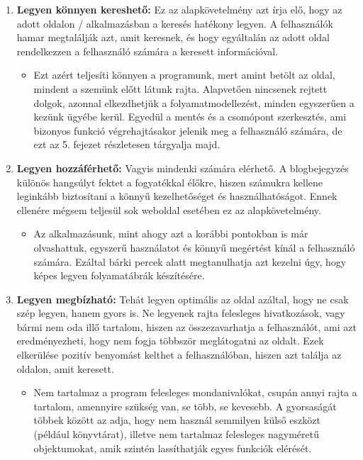 \begin{enumerate}
\item \textbf{Legyen könnyen kereshető:} Ez az alapkövetelmény azt írja elő, hogy az adott oldalon / alkalmazásban a keresés hatékony legyen. A felhasználók hamar megtalálják azt, amit keresnek, és hogy egyáltalán az adott oldal rendelkezzen a felhasználó számára a keresett információval.

\begin{itemize}
\item Ezt azért teljesíti könnyen a programunk, mert amint betölt az oldal, mindent a szemünk előtt látunk rajta. Alapvetően nincsenek rejtett dolgok, azonnal elkezdhetjük a folyamatmodellezést, minden egyszerűen a kezünk ügyébe kerül. Egyedül a mentés és a csomópont szerkesztés, ami bizonyos funkció végrehajtásakor jelenik meg a felhasználó számára, de ezt az 5. fejezet részletesen tárgyalja majd.
\end{itemize}

\item \textbf{Legyen hozzáférhető:} Vagyis mindenki számára elérhető. A blogbejegyzés különös hangsúlyt fektet a fogyatékkal élőkre, hiszen számukra kellene leginkább biztosítani a könnyű kezelhetőséget és használhatóságot. Ennek ellenére mégsem teljesül sok weboldal esetében ez az alapkövetelmény.

\begin{itemize}
\item Az alkalmazásunk, mint ahogy azt a korábbi pontokban is már olvashattuk, egyszerű használatot és könnyű megértést kínál a felhasználó számára. Ezáltal bárki percek alatt megtanulhatja azt kezelni úgy, hogy képes legyen folyamatábrák készítésére.
\end{itemize}

\item \textbf{Legyen megbízható:} Tehát legyen optimális az oldal azáltal, hogy ne csak szép legyen, hanem gyors is. Ne legyenek rajta felesleges hivatkozások, vagy bármi nem oda illő tartalom, hiszen az összezavarhatja a felhasználót, ami azt eredményezheti, hogy nem fogja többször meglátogatni az oldalt. Ezek elkerülése pozitív benyomást kelthet a felhasználóban, hiszen azt találja az oldalon, amit keresett.

\begin{itemize}
\item Nem tartalmaz a program felesleges mondanivalókat, csupán annyi rajta a tartalom, amennyire szükség van, se több, se kevesebb. A gyorsaságát többek között az adja, hogy nem használ semmilyen külső eszközt (például könyvtárat), illetve nem tartalmaz felesleges nagyméretű objektumokat, amik szintén lassíthatják egyes funkciók elérését.
\end{itemize}

\end{enumerate}